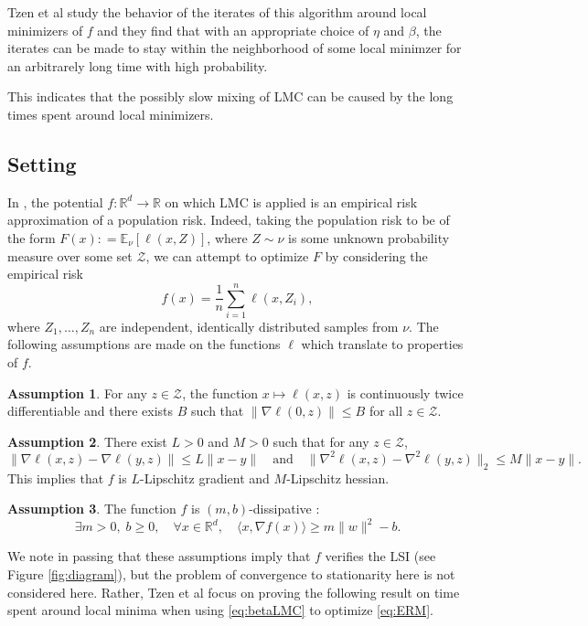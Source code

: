 \documentclass[11pt,twoside]{article}
\theoremstyle{definition}
\newtheorem{assumption}{Assumption}
\newcommand{\E}{\mathbb{E}}
\newcommand{\R}{\mathbb{R}}
\begin{document}
Tzen et al study the behavior of the iterates of this algorithm around local minimizers of $f$ and they find that with an appropriate choice of $\eta$ and $\beta$, the iterates can be made to stay within the neighborhood of some local minimzer for an arbitrarely long time with high probability.

This indicates that the possibly slow mixing of LMC can be caused by the long times spent around local minimizers.


\subsection{Setting}

In \cite{tzen_local_2018}, the potential $f: \R^d \rightarrow \R$ on which LMC is applied is an empirical risk approximation of a population risk. Indeed, taking the population risk to be of the form
\(
F(x) : = \E_\nu [\ell(x, Z)]
\), where $Z \sim \nu$ is some unknown probability measure over some set $\mathcal{Z}$, we can attempt to optimize $F$ by considering the empirical risk
\begin{equation}
f(x) = \frac{1}{n} \sum_{i=1}^{n}\ell(x, Z_i),
\label{eq:ERM}
\end{equation}
where $Z_1, \dots, Z_n$ are independent, identically distributed samples from $\nu$. The following assumptions are made on the functions $\ell$ which translate to properties of $f$.
\begin{assumption}
  For any $z \in \mathcal{Z}$, the function $x \mapsto \ell(x, z)$ is continuously twice differentiable and there exists $B$ such that $\| \nabla \ell (0, z) \| \leq B$ for all $z \in \mathcal{Z}$.
\end{assumption}
\begin{assumption}
  There exist $L > 0$ and $M> 0$ such that for any $z \in \mathcal{Z}$,
  \[
  \| \nabla \ell(x, z) - \nabla \ell(y, z)\| \leq L \|x - y\| \quad \text{and} \quad \| \nabla^2 \ell(x, z) - \nabla^2 \ell(y, z)\|_2 \leq M \|x - y\|.
  \]
  This implies that $f$ is $L$-Lipschitz gradient and $M$-Lipschitz hessian.
\end{assumption}
\begin{assumption}
  The function $f$ is $(m, b)$-dissipative :
  \[
  \exists m>0, \; b\geq 0, \quad \forall x \in \R^d, \quad \langle x, \nabla f(x) \rangle \geq m \|w\|^2 - b.
  \]
  \label{ass:dissip}
\end{assumption}

We note in passing that these assumptions imply that $f$ verifies the LSI (see Figure \ref{fig:diagram}), but the problem of convergence to stationarity here is not considered here. Rather, Tzen et al focus on proving the following result on time spent around local minima when using \eqref{eq:betaLMC} to optimize \eqref{eq:ERM}.
\end{document}
